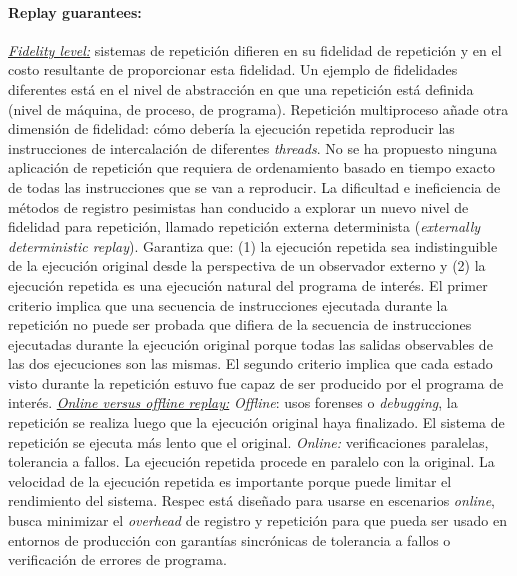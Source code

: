 \paragraph{\textnormal{\textbf{Replay guarantees:}}}
\underline{\emph{Fidelity level:}} sistemas de repetición difieren en su fidelidad de repetición y en el costo resultante de proporcionar esta fidelidad. Un ejemplo de fidelidades diferentes está en el nivel de abstracción en que una repetición está definida (nivel de máquina, de proceso, de programa). Repetición multiproceso añade otra dimensión de fidelidad: cómo debería la ejecución repetida reproducir las instrucciones de intercalación de diferentes \emph{threads}. No se ha propuesto ninguna aplicación de repetición que requiera de ordenamiento basado en tiempo exacto de todas las instrucciones que se van a reproducir. La dificultad e ineficiencia de métodos de registro pesimistas han conducido a explorar un nuevo nivel de fidelidad para repetición, llamado repetición externa determinista (\emph{externally deterministic replay}). Garantiza que: (1) la ejecución repetida sea indistinguible de la ejecución original desde la perspectiva de un observador externo y (2) la ejecución repetida es una ejecución natural del programa de interés. El primer criterio implica que una secuencia de instrucciones ejecutada durante la repetición no puede ser probada que difiera de la secuencia de instrucciones ejecutadas durante la ejecución original porque todas las salidas observables de las dos ejecuciones son las mismas. El segundo criterio implica que cada estado visto durante la repetición estuvo fue capaz de ser producido por el programa de interés. \underline{\emph{Online versus offline replay:}} \emph{Offline}: usos forenses o \emph{debugging}, la repetición se realiza luego que la ejecución original haya finalizado. El sistema de repetición se ejecuta más lento que el original. \emph{Online:} verificaciones paralelas, tolerancia a fallos. La ejecución repetida procede en paralelo con la original. La velocidad de la ejecución repetida es importante porque puede limitar el rendimiento del sistema. Respec está diseñado para usarse en escenarios \emph{online}, busca minimizar el \emph{overhead} de registro y repetición para que pueda ser usado en entornos de producción con garantías sincrónicas de tolerancia a fallos o verificación de errores de programa.

